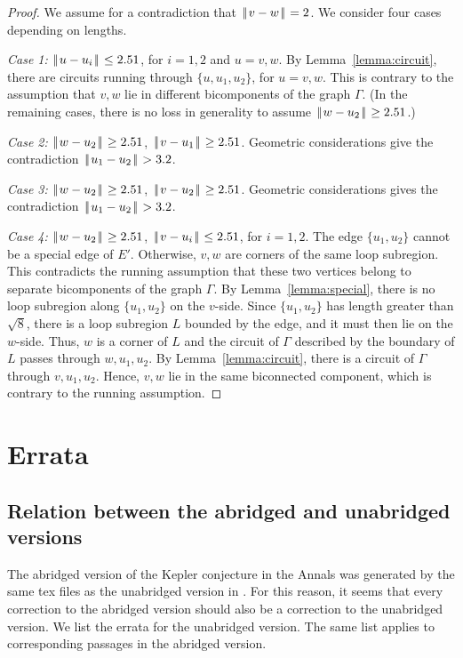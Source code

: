 \documentclass[11pt]{amsart}
\def\|{{\hskip0.1em|\hskip-0.15em|\hskip0.1em}}
\begin{document}
\begin{proof} We assume for a contradiction that $\|v-w\|=2$.
We consider four cases depending on lengths.  

{\it Case 1:} $\|u-u_i\|\le 2.51$, for $i=1,2$ and $u=v,w$.
By Lemma~\ref{lemma:circuit}, there are circuits running through
$\{u,u_1,u_2\}$, for $u=v,w$.  This is contrary to the assumption
that $v,w$ lie in different bicomponents of the graph $\Gamma$.  (In the remaining cases, there is
no loss in generality to assume $\|w-u_2\|\ge 2.51$.)

{\it Case 2:} $\|w-u_2\|\ge 2.51$, $\|v-u_1\|\ge 2.51$.
Geometric considerations give the contradiction
$\|u_1-u_2\|>3.2$.

{\it Case 3:} $\|w-u_2\|\ge 2.51$, $\|v-u_2\|\ge 2.51$.
Geometric considerations gives the contradiction
$\|u_1-u_2\|>3.2$.

{\it Case 4:} $\|w-u_2\|\ge 2.51$, $\|v-u_i\|\le 2.51$, for $i=1,2$.
The edge $\{u_1,u_2\}$ cannot be a special edge of $E'$.  Otherwise,
$v,w$ are corners of the same loop subregion.  This contradicts
the running assumption that these two vertices belong to separate
bicomponents of the graph $\Gamma$.  By Lemma~\ref{lemma:special}, there is no loop subregion along $\{u_1,u_2\}$ on the $v$-side.
Since $\{u_1,u_2\}$ has length greater than $\sqrt8$, there
is a loop subregion $L$ bounded by the edge, and it must then lie
on the $w$-side.  Thus, $w$ is a corner of $L$ and the circuit of
$\Gamma$ described by the boundary of $L$ passes through $w,u_1,u_2$.
By Lemma~\ref{lemma:circuit}, there is a circuit of $\Gamma$ through
$v,u_1,u_2$.  Hence, $v,w$ lie in the same biconnected component,
which is contrary to the running assumption.
\end{proof}



{}\baselineskip
\section{Errata}


\subsection*{Relation between the abridged and unabridged versions}

The abridged version of the Kepler conjecture
in the Annals \cite{Hales:2005:Annals}
was generated by the same tex
files as the unabridged version in \cite{Hales:2006:DCG}.
For this reason,
it seems that every correction to
the abridged version should also be a correction to the unabridged version.
We list the errata for the
unabridged version. The same list applies to corresponding 
passages in the abridged version.  
\end{document}
